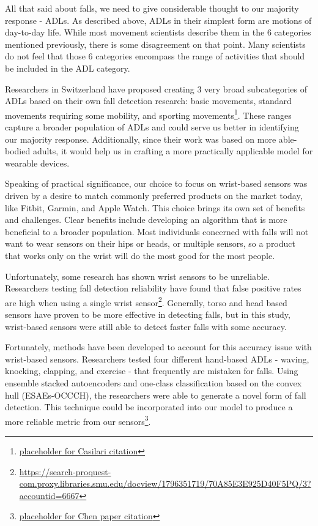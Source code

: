 \documentclass{llncs}
\begin{document}
	All that said about falls, we need to give considerable thought to our majority response - ADLs. As described above, ADLs in their simplest form are motions of day-to-day life. While most movement scientists describe them in the 6 categories mentioned previously, there is some disagreement on that point. Many scientists do not feel that those 6 categories encompass the range of activities that should be included in the ADL category.
	
	Researchers in Switzerland have proposed creating 3 very broad subcategories of ADLs based on their own fall detection research: basic movements, standard movements requiring some mobility, and sporting movements\footnote{\url{placeholder for Casilari citation}}. These ranges capture a broader population of ADLs and could serve us better in identifying our majority response. Additionally, since their work was based on more able-bodied adults, it would help us in crafting a more practically applicable model for wearable devices.
	
	Speaking of practical significance, our choice to focus on wrist-based sensors was driven by a desire to match commonly preferred products on the market today, like Fitbit, Garmin, and Apple Watch. This choice brings its own set of benefits and challenges. Clear benefits include developing an algorithm that is more beneficial to a broader population. Most individuals concerned with falls will not want to wear sensors on their hips or heads, or multiple sensors, so a product that works only on the wrist will do the most good for the most people. 
	
	Unfortunately, some research has shown wrist sensors to be unreliable. Researchers testing fall detection reliability have found that false positive rates are high when using a single wrist sensor\footnote{\url{https://search-proquest-com.proxy.libraries.smu.edu/docview/1796351719/70A85E3E925D40F5PQ/3?accountid=6667}}. Generally, torso and head based sensors have proven to be more effective in detecting falls, but in this study, wrist-based sensors were still able to detect faster falls with some accuracy.
	
	Fortunately, methods have been developed to account for this accuracy issue with wrist-based sensors. Researchers tested four different hand-based ADLs - waving, knocking, clapping, and exercise - that frequently are mistaken for falls. Using ensemble stacked autoencoders and one-class classification based on the convex hull (ESAEs-OCCCH), the researchers were able to generate a novel form of fall detection. This technique could be incorporated into our model to produce a more reliable metric from our sensors\footnote{\url{placeholder for Chen paper citation}}.
	
\end{document}
